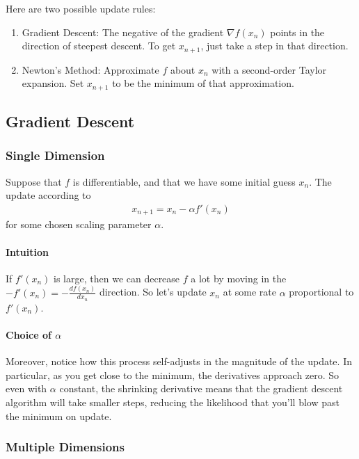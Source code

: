 \documentclass[a4paper,12pt]{scrartcl}
\theoremstyle{definition}
\theoremstyle{remark}
\begin{document}
Here are two possible update rules:
\begin{enumerate}
  \item Gradient Descent: The negative of the gradient $\nabla f(x_n)$
    points in the direction of steepest descent. To get $x_{n+1}$, just
    take a step in that direction.
  \item Newton's Method: Approximate $f$ about $x_n$ with a second-order
    Taylor expansion. Set $x_{n+1}$ to be the minimum of that approximation.
\end{enumerate}


\subsection{Gradient Descent}

\subsubsection{Single Dimension}

Suppose that $f$ is differentiable, and that we have some initial guess
$x_n$. The update according to
\begin{align*}
  x_{n+1} = x_n - \alpha f'(x_n)
\end{align*}
for some chosen scaling parameter $\alpha$.

\paragraph{Intuition}
If $f'(x_n)$ is large, then we can decrease $f$ a lot by moving in the
$-f'(x_n) = -\frac{df(x_n)}{dx_n}$ direction.  So let's update $x_n$ at
some rate $\alpha$ proportional to $f'(x_n)$.

\paragraph{Choice of $\alpha$}
Moreover, notice how this process self-adjusts in the
magnitude of the update.  In particular, as you get close to
the minimum, the derivatives approach zero.  So even with 
$\alpha$ constant, the shrinking derivative means that the gradient
descent algorithm will take smaller steps, reducing the likelihood that
you'll blow past the minimum on update.


\subsubsection{Multiple Dimensions}
\end{document}
